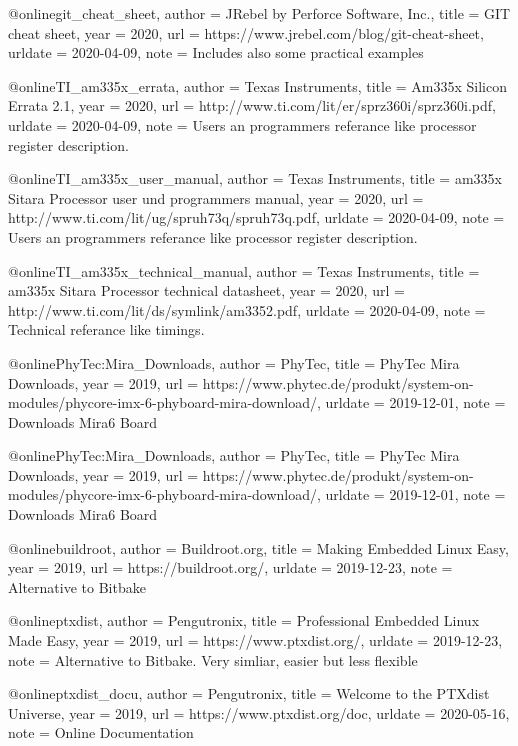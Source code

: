 @online{git_cheat_sheet,
author = {JRebel by Perforce Software, Inc.},
title = {GIT cheat sheet},
year = 2020,
url = {https://www.jrebel.com/blog/git-cheat-sheet},
urldate = {2020-04-09},
note = {Includes also some practical examples}
}


@online{TI_am335x_errata,
author = {Texas Instruments},
title = {Am335x Silicon Errata 2.1},
year = 2020,
url = {http://www.ti.com/lit/er/sprz360i/sprz360i.pdf},
urldate = {2020-04-09},
note = {Users an programmers referance like processor register description.}
}

@online{TI_am335x_user_manual,
author = {Texas Instruments},
title = {am335x Sitara Processor user und programmers manual},
year = 2020,
url = {http://www.ti.com/lit/ug/spruh73q/spruh73q.pdf},
urldate = {2020-04-09},
note = {Users an programmers referance like processor register description.}
}


@online{TI_am335x_technical_manual,
author = {Texas Instruments},
title = {am335x Sitara Processor technical datasheet},
year = 2020,
url = {http://www.ti.com/lit/ds/symlink/am3352.pdf},
urldate = {2020-04-09},
note = {Technical referance like timings.}
}




@online{PhyTec:Mira_Downloads,
author = {PhyTec},
title = {{PhyTec Mira} Downloads},
year = 2019,
url = {https://www.phytec.de/produkt/system-on-modules/phycore-imx-6-phyboard-mira-download/},
urldate = {2019-12-01},
note = {Downloads Mira6 Board}
}




@online{PhyTec:Mira_Downloads,
author = {PhyTec},
title = {{PhyTec Mira} Downloads},
year = 2019,
url = {https://www.phytec.de/produkt/system-on-modules/phycore-imx-6-phyboard-mira-download/},
urldate = {2019-12-01},
note = {Downloads Mira6 Board}
}

@online{buildroot,
author = {Buildroot.org},
title = {Making Embedded Linux Easy},
year = 2019,
url =  {https://buildroot.org/},
urldate = {2019-12-23},
note = {Alternative to Bitbake}
}

@online{ptxdist,
    author = {Pengutronix},
    title = {Professional Embedded Linux Made Easy},
    year = 2019,
    url = {https://www.ptxdist.org/},
    urldate = {2019-12-23},
    note = { Alternative to Bitbake. Very simliar, easier but less flexible}
}

@online{ptxdist_docu,
    author = {Pengutronix},
    title = {Welcome to the PTXdist Universe},
    year = 2019,
    url = {https://www.ptxdist.org/doc},
    urldate = {2020-05-16},
    note = {Online Documentation}
}

